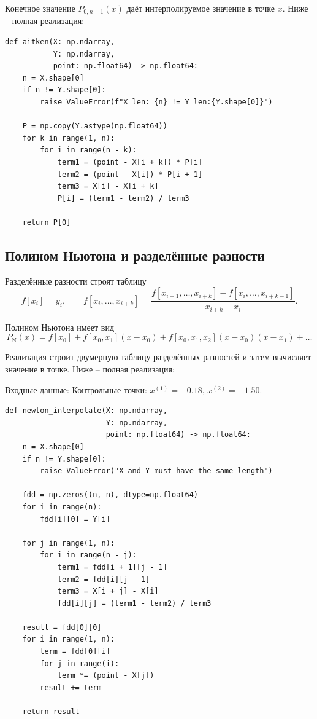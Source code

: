 Конечное значение $P_{0,n-1}(x)$ даёт интерполируемое значение в точке $x$. Ниже -- полная реализация:
\begin{lstlisting}[style=pythonstyle,caption={Реализация схемы Эйткена}]
def aitken(X: np.ndarray,
           Y: np.ndarray,
           point: np.float64) -> np.float64:
    n = X.shape[0]
    if n != Y.shape[0]:
        raise ValueError(f"X len: {n} != Y len:{Y.shape[0]}")

    P = np.copy(Y.astype(np.float64))
    for k in range(1, n):
        for i in range(n - k):
            term1 = (point - X[i + k]) * P[i]
            term2 = (point - X[i]) * P[i + 1]
            term3 = X[i] - X[i + k]
            P[i] = (term1 - term2) / term3

    return P[0]
\end{lstlisting}

\subsection{Полином Ньютона и разделённые разности}
Разделённые разности строят таблицу
\[
f[x_i]=y_i,\qquad f[x_i,\dots,x_{i+k}] = \frac{f[x_{i+1},\dots,x_{i+k}] - f[x_i,\dots,x_{i+k-1}]}{x_{i+k}-x_i}.
\]

Полином Ньютона имеет вид
\[
P_{\text{N}}(x)=f[x_0]+f[x_0,x_1](x-x_0)+f[x_0,x_1,x_2](x-x_0)(x-x_1)+\dots
\]

Реализация строит двумерную таблицу разделённых разностей и затем вычисляет значение в точке. Ниже -- полная реализация:

Входные данные:
Контрольные точки: $x^{(1)}=-0.18$, $x^{(2)}=-1.50$.

\begin{lstlisting}[style=pythonstyle,caption={Реализация Ньютона}]
def newton_interpolate(X: np.ndarray,
                       Y: np.ndarray,
                       point: np.float64) -> np.float64:
    n = X.shape[0]
    if n != Y.shape[0]:
        raise ValueError("X and Y must have the same length")

    fdd = np.zeros((n, n), dtype=np.float64)
    for i in range(n):
        fdd[i][0] = Y[i]

    for j in range(1, n):
        for i in range(n - j):
            term1 = fdd[i + 1][j - 1]
            term2 = fdd[i][j - 1]
            term3 = X[i + j] - X[i]
            fdd[i][j] = (term1 - term2) / term3

    result = fdd[0][0]
    for i in range(1, n):
        term = fdd[0][i]
        for j in range(i):
            term *= (point - X[j])
        result += term

    return result
\end{lstlisting}

